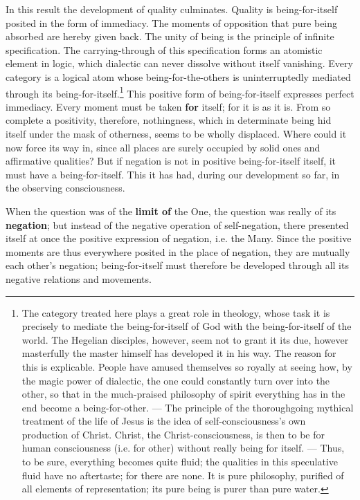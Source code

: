 \documentclass[12pt,a4paper,openany]{book}
\newcommand{\opage}[1]{\marginnote{\footnotesize\textit{[#1]}}}
\begin{document}
In this result the development of quality culminates.
Quality is being-for-itself posited in the form of
immediacy. The moments of opposition that pure
being absorbed are hereby given back. The unity of being
is the principle of infinite specification. The carrying-through
of this specification forms an atomistic
element in logic, which dialectic can never dissolve
without itself vanishing. Every category is a logical
atom whose being-for-the-others is uninterruptedly mediated
through its being-for-itself.\footnote{The category treated here plays a great role in theology, whose task it is precisely to mediate the being-for-itself of God with the being-for-itself of the world. The Hegelian disciples, however, seem not to grant it its due, however masterfully the master himself has developed it in his way. The reason for this is explicable. People have amused themselves so royally at seeing how, by the magic power of dialectic, the one could constantly turn over into the other, so that in the much-praised philosophy of spirit everything has in the end become a being-for-other. --- The principle of the thoroughgoing mythical treatment of the life of Jesus is the idea of self-consciousness's own production of Christ. Christ, the Christ-consciousness, is then to be for human consciousness (i.e. for other) without really being for itself. --- Thus, to be sure, everything becomes quite fluid; the qualities in this speculative fluid have no aftertaste; for there are none. It is pure philosophy, purified of all elements of representation; its pure being is purer than pure water.}
\setcounter{footnote}{0}%
\opage{20}This positive form of being-for-itself expresses perfect immediacy. Every moment must be taken \textbf{for} itself; for it is as it is. From
so complete a positivity, therefore, nothingness,
which in determinate being hid itself under the mask of otherness,
seems to be wholly displaced. Where could it now
force its way in, since all places are surely occupied by solid
ones and affirmative qualities? But if negation is not in positive being-for-itself
itself, it must have a being-for-itself. This
it has had, during our development so far, in the observing
consciousness.

When the question was of the \textbf{limit of} the One,
the question was really of its \textbf{negation}; but instead of
the negative operation of self-negation, there presented
itself at once the positive expression of negation, i.e. the Many. Since
the positive moments are thus everywhere posited in
the place of negation, they are mutually each other's
\setcounter{footnote}{0}%
\opage{21}negation; being-for-itself must therefore be developed through
all its negative relations and movements.
\end{document}
